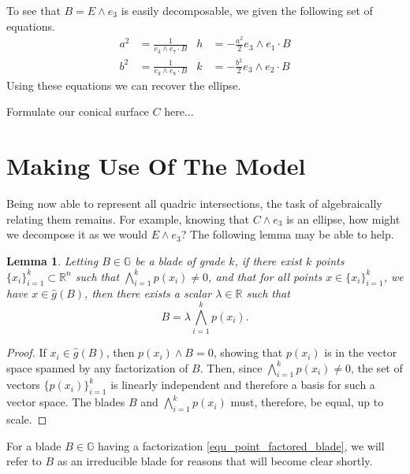 \documentclass{birkjour}
\newtheorem{lem}[thm]{Lemma}
\theoremstyle{definition}
\theoremstyle{remark}
\numberwithin{equation}{section}
\newcommand{\R}{\mathbb{R}}
\newcommand{\G}{\mathbb{G}}
\newcommand{\gh}{\hat{g}}
\begin{document}
To see that $B=E\wedge e_3$ is easily decomposable, we given the following set of
equations.
\begin{align*}
a^2 &= \frac{1}{e_3\wedge e_7\cdot B} &
h &= -\frac{a^2}{2}e_3\wedge e_1\cdot B \\
b^2 &= \frac{1}{e_3\wedge e_8\cdot B} &
k &= -\frac{b^2}{2}e_3\wedge e_2\cdot B
\end{align*}
Using these equations we can recover the ellipse.

Formulate our conical surface $C$ here...

\section{Making Use Of The Model}

Being now able to represent all quadric intersections, the task of
algebraically relating them remains.  For example, knowing that
$C\wedge e_3$ is an ellipse, how might we decompose it
as we would $E\wedge e_3$?  The following lemma may be able to help.
\begin{lem}\label{lma_point_factored_blade}
Letting $B\in\G$ be a blade of grade $k$, if there exist $k$ points $\{x_i\}_{i=1}^k\subset\R^n$
such that $\bigwedge_{i=1}^k p(x_i)\neq 0$, and that for all points
$x\in\{x_i\}_{i=1}^k$, we have $x\in\gh(B)$, then there exists a scalar $\lambda\in\R$
such that
\begin{equation}\label{equ_point_factored_blade}
B = \lambda\bigwedge_{i=1}^k p(x_i).
\end{equation}
\end{lem}
\begin{proof}
If $x_i\in\gh(B)$, then $p(x_i)\wedge B=0$, showing that $p(x_i)$ is in the vector
space spanned by any factorization of $B$.  Then, since $\bigwedge_{i=1}^k p(x_i)\neq 0$,
the set of vectors $\{p(x_i)\}_{i=1}^k$ is linearly independent and therefore
a basis for such a vector space.  The blades $B$ and $\bigwedge_{i=1}^k p(x_i)$
must, therefore, be equal, up to scale.
\end{proof}
For a blade $B\in\G$ having a factorization \eqref{equ_point_factored_blade},
we will refer to $B$ as an irreducible blade for reasons that will become clear shortly.
\end{document}
